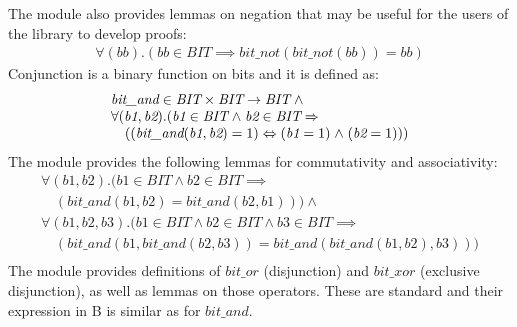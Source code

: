 \documentclass[a4paper]{llncs}
\begin{document}
The module also provides lemmas on negation that may be useful for the
users of the library to develop proofs:
$$
\begin{array}{l}
\forall (\textit{bb}).(\textit{bb} \in \textit{BIT} \implies \textit{bit\_not}(\textit{bit\_not}(\textit{bb})) = \textit{bb})
\end{array}
$$
Conjunction is a binary function on bits and it is defined as:
$$
\begin{array}{l}
\textit{bit\_and} \in \textit{BIT} \times \textit{BIT} \fun \textit{BIT} \land \\
\forall (\textit{b1}, \textit{b2}).(\textit{b1}  \in \textit{BIT}  \land \textit{b2} \in \textit{BIT} \implies \\
\quad ((\textit{bit\_and}(\textit{b1}, \textit{b2}) = 1) \iff (\textit{b1} = 1)  \land  (\textit{b2} = 1)))
\end{array}
$$
The module provides the following lemmas for commutativity and associativity:
$$
\begin{array}{l}
\forall (\textit{b1},\textit{b2}).(\textit{b1} \in \textit{BIT} \land \textit{b2} \in \textit{BIT} \implies \\
\quad (\textit{bit\_and}(\textit{b1}, \textit{b2}) = \textit{bit\_and}(\textit{b2},\textit{b1})))\land \\
\forall (\textit{b1},\textit{b2},\textit{b3}).(\textit{b1} \in \textit{BIT} \land  \textit{b2} \in \textit{BIT} \land \textit{b3} \in \textit{BIT} \implies \\
\quad (\textit{bit\_and}(\textit{b1}, \textit{bit\_and}(\textit{b2},\textit{b3})) = \textit{bit\_and}(\textit{bit\_and}(\textit{b1},\textit{b2}),\textit{b3})))\\
\end{array}
$$
The module provides definitions of $\textit{bit\_or}$ (disjunction)
and $\textit{bit\_xor}$ (exclusive disjunction), as well as lemmas on
those operators. These are standard and their expression in B is
similar as for $\textit{bit\_and}$.
\end{document}
